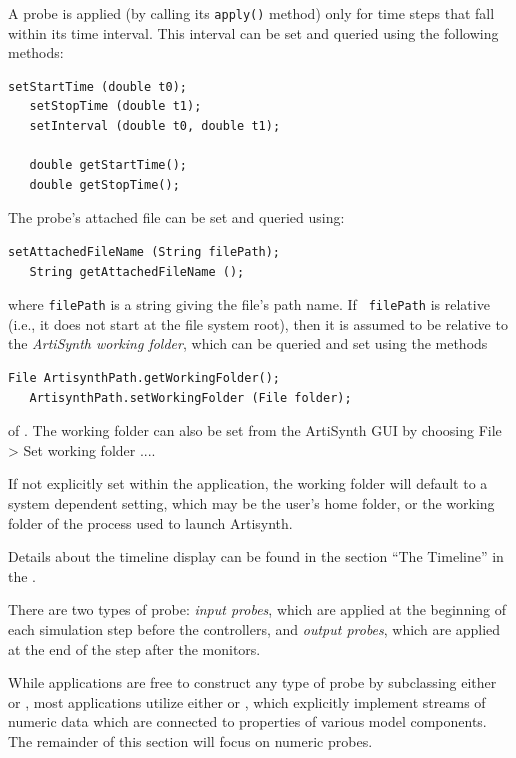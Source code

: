 A probe is applied (by calling its {\tt apply()} method) only for time
steps that fall within its time interval. This interval can be set and
queried using the following methods:
\begin{lstlisting}[]
   setStartTime (double t0);
   setStopTime (double t1);
   setInterval (double t0, double t1);
 
   double getStartTime();
   double getStopTime();
\end{lstlisting}
%
The probe's attached file can be set and queried using:
\begin{lstlisting}[]
   setAttachedFileName (String filePath);
   String getAttachedFileName ();
\end{lstlisting}
%
where {\tt filePath} is a string giving the file's path name.  If {\tt
filePath} is relative (i.e., it does not start at the file system root), then
it is assumed to be relative to the {\it ArtiSynth working folder}, which
can be queried and set using the methods
%
\begin{lstlisting}[]
   File ArtisynthPath.getWorkingFolder();
   ArtisynthPath.setWorkingFolder (File folder);
\end{lstlisting}
%
of .
The working folder can also be set from the ArtiSynth GUI
by choosing {\sf File > Set working folder ...}.
\begin{sideblock}
If not explicitly set within the application, the working folder will default
to a system dependent setting, which may be the user's home folder, or the
working folder of the process used to launch Artisynth.
\end{sideblock}

Details about the timeline display can be found in
the section ``The Timeline'' in the
.

There are two types of probe: {\it input probes}, which are applied at
the beginning of each simulation step before the controllers, and {\it
output probes}, which are applied at the end of the step after the
monitors.

While applications are free to construct any type of probe by
subclassing either  or
, most applications
utilize either  or
, which
explicitly implement streams of numeric data which are connected to
properties of various model components.  The remainder of this section
will focus on numeric probes.

